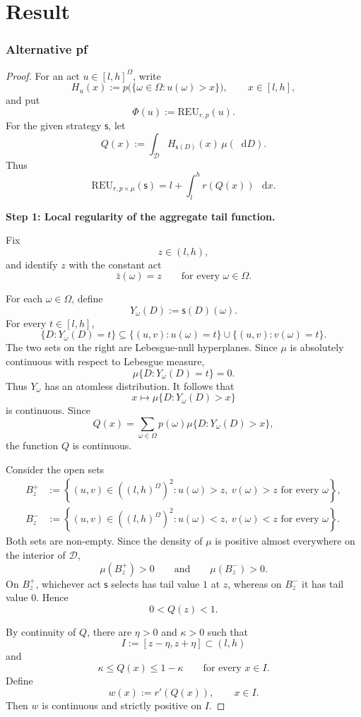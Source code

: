 \documentclass[a4paper,final]{article}
\newcommand\REU{\mathrm{REU}}
\newcommand{\Decs}{\mathcal{D}}
\newcommand\s{\mathsf{s}}
\newcommand*\diff{\mathop{}\!\mathrm{d}}
\renewcommand{\leq}{\leqslant}
\newenvironment{CCM rewritten}
{\begingroup\color{blue}} %
{\endgroup}              %
\begin{document}
\part{Result}

\section{Alternative pf}
\begin{proof}
For an act \(u\in[l,h]^\Omega\), write
\[
H_u(x)
:=
p\bigl(\{\omega\in\Omega:u(\omega)>x\}\bigr),
\qquad x\in[l,h],
\]
and put
\[
\Phi(u):=\REU_{r,p}(u).
\]
For the given strategy \(\s\), let
\[
Q(x)
:=
\int_{\Decs}H_{\s(D)}(x)\,\mu(\diff D).
\]
Thus
\[
\REU_{r,p\times \mu}(\s)
=
l+\int_l^h r(Q(x))\,\diff x.
\]

\medskip
\noindent
\textbf{Step 1: Local regularity of the aggregate tail function.}

Fix
\[
z\in(l,h),
\]
and identify \(z\) with the constant act
\[
\bar z(\omega)=z
\qquad
\text{for every }\omega\in\Omega.
\]

For each \(\omega\in\Omega\), define
\[
Y_\omega(D):=\s(D)(\omega).
\]
For every \(t\in[l,h]\),
\[
\{D:Y_\omega(D)=t\}
\subseteq
\{(u,v):u(\omega)=t\}
\cup
\{(u,v):v(\omega)=t\}.
\]
The two sets on the right are Lebesgue-null hyperplanes. Since
\(\mu\) is absolutely continuous with respect to Lebesgue measure,
\[
\mu\{D:Y_\omega(D)=t\}=0.
\]
Thus \(Y_\omega\) has an atomless distribution. It follows that
\[
x\longmapsto \mu\{D:Y_\omega(D)>x\}
\]
is continuous. Since
\[
Q(x)
=
\sum_{\omega\in\Omega}
p(\omega)\mu\{D:Y_\omega(D)>x\},
\]
the function \(Q\) is continuous.

Consider the open sets
\begin{align}
B_z^+
&:=
\left\{
(u,v)\in((l,h)^\Omega)^2:
u(\omega)>z,\ v(\omega)>z
\text{ for every }\omega
\right\},\\
B_z^-
&:=
\left\{
(u,v)\in((l,h)^\Omega)^2:
u(\omega)<z,\ v(\omega)<z
\text{ for every }\omega
\right\}.
\end{align}
Both sets are non-empty. Since the density of \(\mu\) is positive
almost everywhere on the interior of \(\Decs\),
\[
\mu(B_z^+)>0
\qquad\text{and}\qquad
\mu(B_z^-)>0.
\]
On \(B_z^+\), whichever act \(\s\) selects has tail value \(1\) at
\(z\), whereas on \(B_z^-\) it has tail value \(0\). Hence
\[
0<Q(z)<1.
\]

By continuity of \(Q\), there are \(\eta>0\) and \(\kappa>0\) such that
\[
I:=[z-\eta,z+\eta]\subset(l,h)
\]
and
\[
\kappa\leq Q(x)\leq 1-\kappa
\qquad
\text{for every }x\in I.
\]
Define
\[
w(x):=r'(Q(x)),
\qquad x\in I.
\]
Then \(w\) is continuous and strictly positive on \(I\).


\end{proof}
\end{document}
